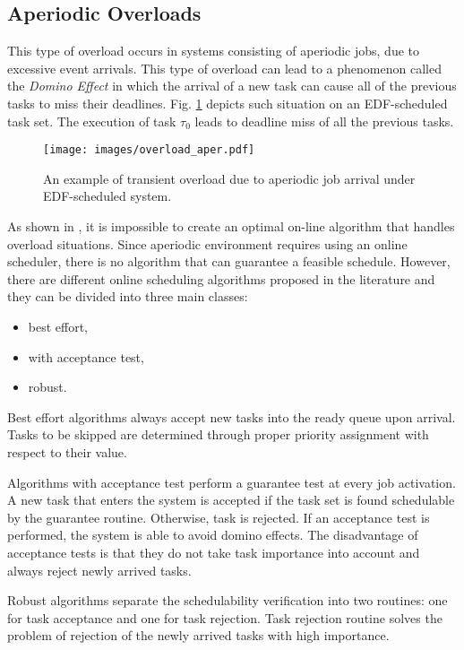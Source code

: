 \subsection{Aperiodic Overloads}
This type of overload occurs in systems consisting of aperiodic jobs, due to excessive event arrivals. 
This type of overload can lead to a phenomenon called the \textit{Domino Effect} in which the arrival of a new task can cause all of the previous tasks to miss their deadlines. 
Fig. \ref{aperiodic} depicts such situation on an EDF-scheduled task set. 
The execution of task $\tau_0$ leads to deadline miss of all the previous tasks.

\begin{figure}[ht]
    \centering
    \texttt{[image: images/overload\_aper.pdf]}
    \caption{An example of transient overload due to aperiodic job arrival under EDF-scheduled system.}
    \label{aperiodic}
\end{figure}

As shown in \cite{buttazzo2011hard}, it is impossible to create an optimal on-line algorithm that handles overload situations.
Since aperiodic environment requires using an online scheduler, there is no algorithm that can guarantee a feasible schedule.
However, there are different online scheduling algorithms proposed in the literature and they can be divided into three main classes:
\begin{itemize}
    \item{best effort,}
    \item{with acceptance test,}
    \item{robust.}
\end{itemize}

Best effort algorithms always accept new tasks into the ready queue upon arrival. Tasks to be skipped are determined through proper priority assignment with respect to their value.

Algorithms with acceptance test perform a guarantee test at every job activation. 
A new task that enters the system is accepted if the task set is found schedulable by the guarantee routine. Otherwise, task is rejected.
If an acceptance test is performed, the system is able to avoid domino effects.
The disadvantage of acceptance tests is that they do not take task importance into account and always reject newly arrived tasks.

Robust algorithms separate the schedulability verification into two routines: one for task acceptance and one for task rejection. 
Task rejection routine solves the problem of rejection of the newly arrived tasks with high importance.

